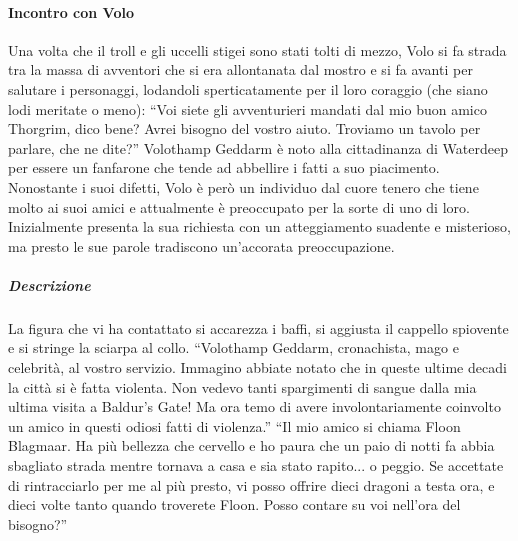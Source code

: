 \documentclass{article}
\begin{document}
\paragraph{Incontro con Volo} 
Una volta che il troll e gli uccelli stigei sono stati tolti di
mezzo, Volo si fa strada tra la massa di avventori che si
era allontanata dal mostro e si fa avanti per salutare i
personaggi, lodandoli sperticatamente per il loro coraggio
(che siano lodi meritate o meno): “Voi siete gli avventurieri mandati dal mio buon amico Thorgrim,
dico bene? Avrei bisogno del vostro aiuto. Troviamo un
tavolo per parlare, che ne dite?”
Volothamp Geddarm è noto alla cittadinanza di
Waterdeep per essere un fanfarone che tende ad abbellire
i fatti a suo piacimento. Nonostante i suoi difetti, Volo
è però un individuo dal cuore tenero che tiene molto ai
suoi amici e attualmente è preoccupato per la sorte di
uno di loro. Inizialmente presenta la sua richiesta con un
atteggiamento suadente e misterioso, ma presto le sue
parole tradiscono un’accorata preoccupazione.

\subparagraph{Descrizione} La figura che vi ha contattato si accarezza i baffi, si
aggiusta il cappello spiovente e si stringe la sciarpa
al collo. “Volothamp Geddarm, cronachista, mago e
celebrità, al vostro servizio. Immagino abbiate notato che
in queste ultime decadi la città si è fatta violenta. Non
vedevo tanti spargimenti di sangue dalla mia ultima visita
a Baldur's Gate! Ma ora temo di avere involontariamente
coinvolto un amico in questi odiosi fatti di violenza.”
“Il mio amico si chiama Floon Blagmaar. Ha più
bellezza che cervello e ho paura che un paio di notti fa
abbia sbagliato strada mentre tornava a casa e sia stato
rapito... o peggio. Se accettate di rintracciarlo per me al
più presto, vi posso offrire dieci dragoni a testa ora, e
dieci volte tanto quando troverete Floon. Posso contare
su voi nell'ora del bisogno?”
\end{document}
